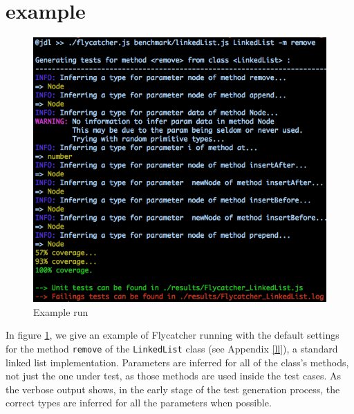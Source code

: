 \section{\textsf{} example}

\begin{figure}[t]
\centering
\includegraphics[scale=0.55]{./components/chapter3/linkedlist.png}
\caption{Example run}
\label{run}
\end{figure}

In figure \ref{run}, we give an example of \textsf{Flycatcher} running with the default settings for the method \texttt{remove} of the \texttt{LinkedList} class (see Appendix \ref{ll}), a standard linked list implementation. Parameters are inferred for all of the class's methods, not just the one under test, as those methods are used inside the test cases. As the verbose output shows, in the early stage of the test generation process, the correct types are inferred for all the parameters when possible.

